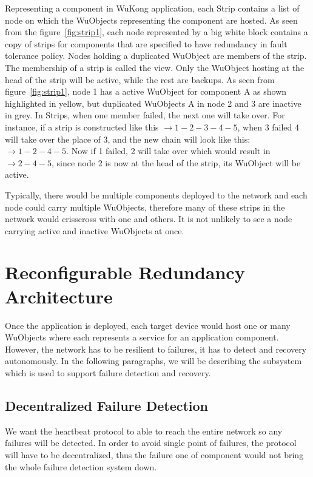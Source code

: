 Representing a component in WuKong application, each Strip contains a list of
node on which the WuObjects representing the component are hosted. As seen from
the figure~\ref{fig:strip1}, each node represented by a big white block contains
a copy of strips for components that are specified to have redundancy in fault
tolerance policy. Nodes holding a duplicated WuObject are members of the strip.
The membership of a strip is called the view. Only the WuObject hosting at the
head of the strip will be active, while the rest are backups.  As seen from
figure~\ref{fig:strip1}, node 1 has a active WuObject for component A as shown
highlighted in yellow, but duplicated WuObjects A in node 2 and 3 are inactive
in grey. In Strips, when one member failed, the next one will take over. For
instance, if a strip is constructed like this $\rightarrow 1-2-3-4-5$, when
3 failed 4 will take over the place of 3, and the new chain will look like this:
$\rightarrow 1-2-4-5$. Now if 1 failed, 2 will take over which would result in
$\rightarrow 2-4-5$, since node 2 is now at the head of the strip, its WuObject
will be active. 

Typically, there would be multiple components deployed to the network and each
node could carry multiple WuObjects, therefore many of these strips in the
network would crisscross with one and others. It is not unlikely to see a node
carrying active and inactive WuObjects at once.

\section{Reconfigurable Redundancy Architecture}

Once the application is deployed, each target device would host one or many
WuObjects where each represents a service for an application component. However,
the network has to be resilient to failures, it has to detect and recovery
autonomously. In the following paragraphs, we will be describing the subsystem
which is used to support failure detection and recovery.

\subsection{Decentralized Failure Detection}
\label{s:dfd}

We want the heartbeat protocol to able to reach the entire network so any
failures will be detected. In order to avoid single point of failures, the
protocol will have to be decentralized, thus the failure one of component would
not bring the whole failure detection system down.

